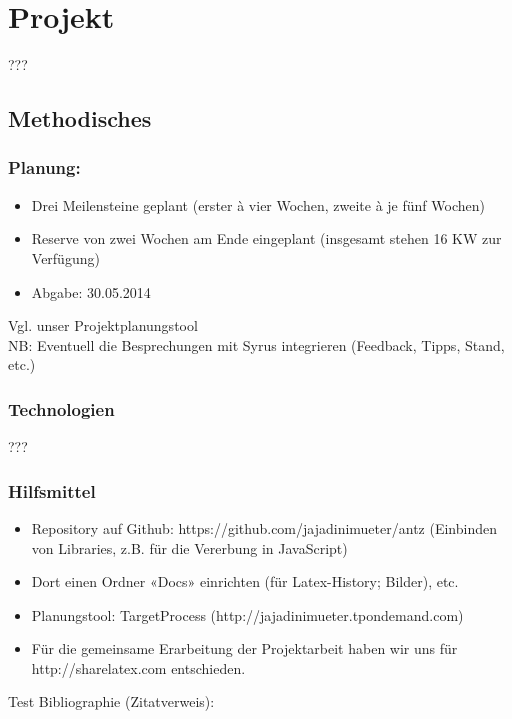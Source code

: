 
\chapter{Projekt}

???

\section{Methodisches}


\subsection*{Planung:}

\begin{itemize}[noitemsep]
\item Drei Meilensteine geplant (erster à vier Wochen, zweite à je fünf Wochen)
\item Reserve von zwei Wochen am Ende eingeplant (insgesamt stehen 16 KW zur Verfügung)
\item Abgabe: 30.05.2014
\end{itemize}

\vspace*{1cm}

Vgl. unser Projektplanungstool \\

NB: Eventuell die Besprechungen mit Syrus integrieren (Feedback, Tipps, Stand, etc.) \\



\subsection{Technologien}

???


\subsection{Hilfsmittel}

\begin{itemize}[noitemsep]
\item Repository auf Github: https://github.com/jajadinimueter/antz (Einbinden von Libraries, z.B. für die Vererbung in JavaScript)
\item Dort einen Ordner «Docs» einrichten (für Latex-History; Bilder), etc.
\item Planungstool: TargetProcess (http://jajadinimueter.tpondemand.com)
\item Für die gemeinsame Erarbeitung der Projektarbeit haben wir uns für http://sharelatex.com entschieden.
\end{itemize}


\vspace*{1cm}


Test Bibliographie (Zitatverweis): \cite[S. 115]{ds-ant}


